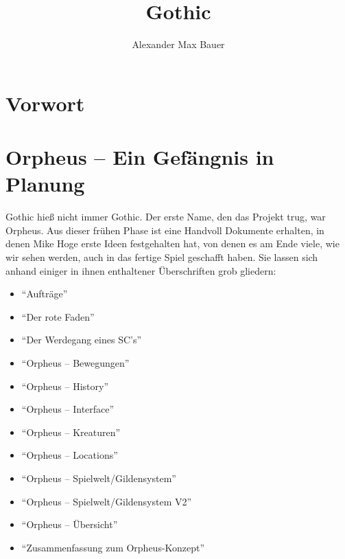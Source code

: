 \documentclass[12pt]{scrbook}
\title{Gothic}
\subtitle{}
\author{Alexander Max Bauer}
\date{}
\begin{document}
\maketitle


\frontmatter
\tableofcontents


\chapter{Vorwort}


\mainmatter
\chapter{Orpheus -- Ein Gefängnis in Planung}\label{ch:orpheus}
Gothic hieß nicht immer Gothic.
Der erste Name, den das Projekt trug, war Orpheus.
Aus dieser frühen Phase ist eine Handvoll Dokumente erhalten, in denen Mike Hoge erste Ideen festgehalten hat, von denen es am Ende viele, wie wir sehen werden, auch in das fertige Spiel geschafft haben.
Sie lassen sich anhand einiger in ihnen enthaltener Überschriften grob gliedern:

\begin{itemize}
   \item \enquote{Aufträge}\autocite[S.~16--17]{orpheus_b_scribbles}
   \item \enquote{Der rote Faden}\autocite{orpheus_der_rote}
   \item \enquote{Der Werdegang eines SC's}\autocite{orpheus_der_werdegang}
   \item \enquote{Orpheus -- Bewegungen}\autocite{orpheus_bewegungen}
   \item \enquote{Orpheus -- History}\autocite[S.~2--3]{orpheus_b_scribbles}
   \item \enquote{Orpheus -- Interface}\autocite{orpheus_interface}
   \item \enquote{Orpheus -- Kreaturen}\autocite[S.~4]{orpheus_b_scribbles}
   \item \enquote{Orpheus -- Locations}\autocite[S.~5]{orpheus_b_scribbles}
   \item \enquote{Orpheus -- Spielwelt/Gildensystem}\autocite{orpheus_gildensystem}
   \item \enquote{Orpheus -- Spielwelt/Gildensystem V2}\autocite{orpheus_gildensystem_v2}
   \item \enquote{Orpheus -- Übersicht}\autocite[S.~11--14]{orpheus_b_scribbles}
   \item \enquote{Zusammenfassung zum Orpheus-Konzept}\autocite{orpheus_zusammenfassung}
\end{itemize}
\end{document}
